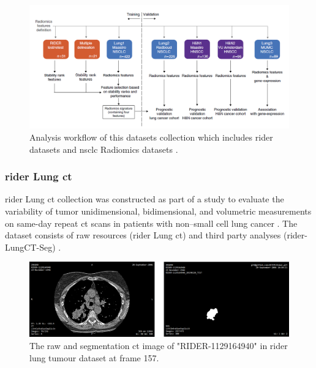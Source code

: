 \documentclass[11pt,times,oneside,openright]{eeereport}
\begin{document}
\begin{figure}[h]
    \centering
    \includegraphics[width=\textwidth]{fig/nsclc_workflow.png}
    \caption{Analysis workflow of this datasets collection which includes \acrshort{rider} datasets and \acrshort{nsclc} Radiomics datasets \cite{aerts2014decoding}.}
    \label{fig:nsclc_workflow}
\end{figure}

\subsubsection{\acrshort{rider} Lung \acrshort{ct}}
\acrfull{rider} Lung \acrshort{ct} collection was constructed as part of a study to evaluate the variability of tumor unidimensional, bidimensional, and volumetric measurements on same-day repeat \acrshort{ct} scans in patients with non–small cell lung cancer \cite{zhao2015data}. The dataset consists of raw resources (\acrshort{rider} Lung \acrshort{ct}) \cite{zhao2015data} and third party analyses (\acrshort{rider}-LungCT-Seg) \cite{wee2020data}.



\begin{figure}[h]
    \centering
    \includegraphics[width=\textwidth]{fig/rider_example2.png}
    \caption{The raw and segmentation \acrshort{ct} image of "RIDER-1129164940" in \acrshort{rider} lung tumour dataset at frame 157.}
    \label{fig:rider_example2}
\end{figure}
\end{document}
